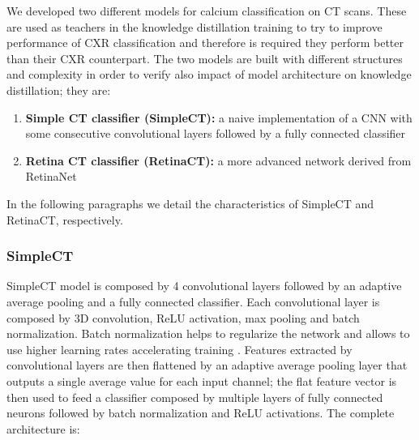 We developed two different models for calcium classification on CT scans.
These are used as teachers in the knowledge distillation training to try to improve performance of CXR classification and therefore is required they perform better than their CXR counterpart.
The two models are built with different structures and complexity in order to verify also impact of model architecture on knowledge distillation; they are:
\begin{enumerate}
    \item \textbf{Simple CT classifier (SimpleCT):} a naive implementation of a CNN with some consecutive convolutional layers followed by a fully
    connected classifier
    \item \textbf{Retina CT classifier (RetinaCT):} a more advanced network derived from RetinaNet \cite{lin2017focal}
\end{enumerate}

In the following paragraphs we detail the characteristics of SimpleCT and RetinaCT, respectively.  


\subsubsection{SimpleCT}
SimpleCT model is composed by 4 convolutional layers followed by an adaptive average pooling and a fully connected classifier.
Each convolutional layer is composed by 3D convolution, ReLU activation, max pooling and batch normalization.
Batch normalization helps to regularize the network and allows to use higher learning rates accelerating training \cite{ioffe2015batch}.
Features extracted by convolutional layers are then flattened by an adaptive average pooling layer that outputs a single average value for each input channel; the flat feature vector is then used to feed a classifier composed by multiple layers of fully connected neurons followed by batch normalization and ReLU activations.
The complete architecture is:

